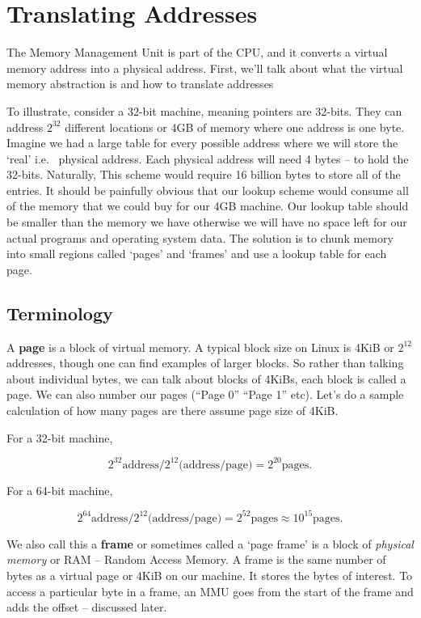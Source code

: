 	\section{Translating Addresses}
	 
	The Memory Management Unit is part of the CPU, and it converts a virtual memory address into a physical address.
	First, we'll talk about what the virtual memory abstraction is and how to translate addresses
	 
	To illustrate, consider a 32-bit machine, meaning pointers are 32-bits.
	They can address $2^{32}$ different locations or 4GB of memory where one address is one byte.
	Imagine we had a large table for every possible address where we will store the `real' i.e. ~physical address.
	Each physical address will need 4 bytes -- to hold the 32-bits.
	Naturally, This scheme would require 16 billion bytes to store all of the entries.
	It should be painfully obvious that our lookup scheme would consume all of the memory that we could buy for our 4GB machine.
	Our lookup table should be smaller than the memory we have otherwise we will have no space left for our actual programs and operating system data.
	The solution is to chunk memory into small regions called `pages' and `frames' and use a lookup table for each page.
	 
	\subsection{Terminology}
	 
	A \textbf{page} is a block of virtual memory.
	A typical block size on Linux is 4KiB or $2^{12}$ addresses, though one can find examples of larger blocks.
	So rather than talking about individual bytes, we can talk about blocks of 4KiBs, each block is called a page.
	We can also number our pages (``Page 0'' ``Page 1'' etc). Let's do a sample calculation of how many pages are there assume page size of 4KiB.
	 
	For a 32-bit machine,
	 
	\[
	 2^{32} \text{address} / 2^{12} \text{(address/page)} = 2^{20} \text{pages}.
	\]
	 
	For a 64-bit machine,
	 
	\[
	 2^{64} \text{address} / 2^{12} \text{(address/page)} = 2^{52} \text{pages} \approx 10^{15} \text{pages}.
	\]
	 
	We also call this a \textbf{frame} or sometimes called a `page frame' is a block of \emph{physical memory} or RAM -- Random Access Memory.
	A frame is the same number of bytes as a virtual page or 4KiB on our machine.
	It stores the bytes of interest.
	To access a particular byte in a frame, an MMU goes from the start of the frame and adds the offset -- discussed later.
	 
